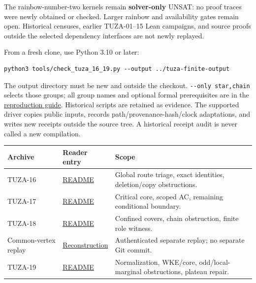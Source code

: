 \documentclass[11pt,a4paper]{article}
\begin{document}
The rainbow-number-two kernels remain \textbf{solver-only} UNSAT: no proof traces were newly obtained or checked. Larger rainbow and availability gates remain open. Historical censuses, earlier TUZA-01--15 Lean campaigns, and source proofs outside the selected dependency interfaces are not newly replayed.

From a fresh clone, use Python 3.10 or later:

\begin{verbatim}
python3 tools/check_tuza_16_19.py --output ../tuza-finite-output
\end{verbatim}

The output directory must be new and outside the checkout. \texttt{-\/-only\ star,chain} selects those groups; all group names and optional formal prerequisites are in the \href{https://github.com/pappa211/ai-math-experiments/blob/main/REPRODUCTION.md#tuza-16-19}{reproduction guide}. Historical scripts are retained as evidence. The supported driver copies public inputs, records path/provenance-hash/clock adaptations, and writes new receipts outside the source tree. A historical receipt audit is never called a new compilation.

{\def\LTcaptype{none} %
\begin{longtable}[]{@{}
  >{\raggedright\arraybackslash}p{}
  >{\raggedright\arraybackslash}p{}
  >{\raggedright\arraybackslash}p{}@{}}
\toprule\noalign{}
\begin{minipage}[b]{\linewidth}\raggedright
Archive
\end{minipage} & \begin{minipage}[b]{\linewidth}\raggedright
Reader entry
\end{minipage} & \begin{minipage}[b]{\linewidth}\raggedright
Scope
\end{minipage} \\
\midrule\noalign{}
\endhead
\bottomrule\noalign{}
\endlastfoot
TUZA-16 & \href{https://github.com/pappa211/ai-math-experiments/blob/main/problems/TUZA-16/README.md}{README} & Global route triage, exact identities, deletion/copy obstructions. \\
TUZA-17 & \href{https://github.com/pappa211/ai-math-experiments/blob/main/problems/TUZA-17/README.md}{README} & Critical core, scoped AC, remaining conditional boundary. \\
TUZA-18 & \href{https://github.com/pappa211/ai-math-experiments/blob/main/problems/TUZA-18/README.md}{README} & Confined covers, chain obstruction, finite role witness. \\
Common-vertex replay & \href{https://github.com/pappa211/ai-math-experiments/blob/main/problems/TUZA-18-replay/RECONSTRUCTION.md}{Reconstruction} & Authenticated separate replay; no separate Git commit. \\
TUZA-19 & \href{https://github.com/pappa211/ai-math-experiments/blob/main/problems/TUZA-19/README.md}{README} & Normalization, WKE/core, odd/local-marginal obstructions, plateau repair. \\
\end{longtable}
}
\end{document}
